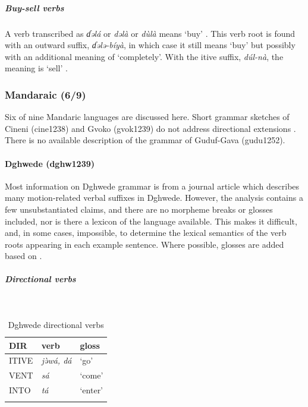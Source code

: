 \subparagraph{Buy-sell verbs}

A verb transcribed as \textit{ɗəlá} or \textit{dəlà} or \textit{dùlà} means `buy' \citep[19, 79]{muazuModernKilbaDictionary2015}. This verb root is found with an outward suffix, \textit{ɗələ-bíyà}, in which case it still means `buy' but possibly with an additional meaning of `completely'. With the itive suffix, \textit{dúl-nà}, the meaning is `sell' \citep[17]{muazuModernKilbaDictionary2015}.

\subsubsection{Mandaraic (6/9)}

Six of nine Mandaric languages are discussed here. Short grammar sketches of Cineni (cine1238) and Gvoko (gvok1239) do not address directional extensions \citep{kimChineneCineneBugdong2010,kimBugdongNaijiliaChadigeodeului2013}. There is no available description of the grammar of Guduf-Gava (gudu1252).

\paragraph*{Dghwede (dghw1239)} \label{dghw}

Most information on Dghwede grammar is from a journal article \citep{frickVerbalSystemDghwede1978} which describes many motion-related verbal suffixes in Dghwede. However, the analysis contains a few unsubstantiated claims, and there are no morpheme breaks or glosses included, nor is there a lexicon of the language available. This makes it difficult, and, in some cases, impossible, to determine the lexical semantics of the verb roots appearing in each example sentence. Where possible, glosses are added based on \citet{hartmannInformationStructureLeft2006}.

\subparagraph{Directional verbs}~

\begin{table}[H]
	\caption{Dghwede directional verbs} 
	\label{tab:dghwV}
	\begin{tabular}{lll} %
		\lsptoprule
		DIR & verb & gloss   \\ %
		\midrule
		ITIVE & \textit{jə̀wá, dá} & `go' \\
		VENT & \textit{sá} & `come' \\
		INTO& \textit{tá} & `enter' \\
		\lspbottomrule
	\end{tabular}
\end{table}

